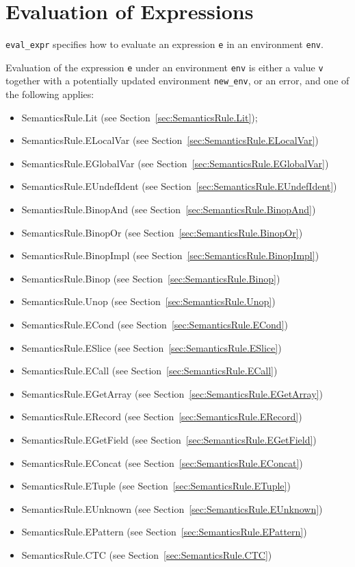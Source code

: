 \documentclass{book}
\begin{document}
\chapter{Evaluation of Expressions \label{chap:eval_expr}}

\texttt{eval\_expr} specifies how to evaluate an expression \texttt{e} in an
environment \texttt{env}. 

Evaluation of the expression \texttt{e} under an environment \texttt{env} is
either a value \texttt{v} together with a potentially updated
environment \texttt{new\_env}, or an error, and one of the following applies:
\begin{itemize}
\item SemanticsRule.Lit (see Section~\ref{sec:SemanticsRule.Lit});
\item SemanticsRule.ELocalVar (see Section~\ref{sec:SemanticsRule.ELocalVar})
\item SemanticsRule.EGlobalVar (see Section~\ref{sec:SemanticsRule.EGlobalVar})
\item SemanticsRule.EUndefIdent (see Section~\ref{sec:SemanticsRule.EUndefIdent})
\item SemanticsRule.BinopAnd (see Section~\ref{sec:SemanticsRule.BinopAnd})
\item SemanticsRule.BinopOr (see Section~\ref{sec:SemanticsRule.BinopOr})
\item SemanticsRule.BinopImpl (see Section~\ref{sec:SemanticsRule.BinopImpl})
\item SemanticsRule.Binop (see Section~\ref{sec:SemanticsRule.Binop})
\item SemanticsRule.Unop (see Section~\ref{sec:SemanticsRule.Unop})
\item SemanticsRule.ECond (see Section~\ref{sec:SemanticsRule.ECond})
\item SemanticsRule.ESlice (see Section~\ref{sec:SemanticsRule.ESlice})
\item SemanticsRule.ECall (see Section~\ref{sec:SemanticsRule.ECall})
\item SemanticsRule.EGetArray (see Section~\ref{sec:SemanticsRule.EGetArray})
\item SemanticsRule.ERecord (see Section~\ref{sec:SemanticsRule.ERecord})
\item SemanticsRule.EGetField (see Section~\ref{sec:SemanticsRule.EGetField})
\item SemanticsRule.EConcat (see Section~\ref{sec:SemanticsRule.EConcat})
\item SemanticsRule.ETuple (see Section~\ref{sec:SemanticsRule.ETuple})
\item SemanticsRule.EUnknown (see Section~\ref{sec:SemanticsRule.EUnknown})
\item SemanticsRule.EPattern (see Section~\ref{sec:SemanticsRule.EPattern})
\item SemanticsRule.CTC (see Section~\ref{sec:SemanticsRule.CTC})
\end{itemize}
\end{document}
